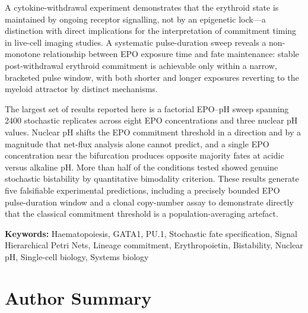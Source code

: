 \documentclass[10pt,letterpaper]{article}
\begin{document}
A cytokine-withdrawal experiment demonstrates that the erythroid state is
maintained by ongoing receptor signalling, not by an epigenetic lock---a
distinction with direct implications for the interpretation of commitment timing
in live-cell imaging studies. A systematic pulse-duration sweep reveals a
non-monotone relationship between EPO exposure time and fate maintenance: stable
post-withdrawal erythroid commitment is achievable only within a narrow,
bracketed pulse window, with both shorter and longer exposures reverting to the
myeloid attractor by distinct mechanisms.

The largest set of results reported here is a factorial EPO--pH sweep spanning
2400 stochastic replicates across eight EPO concentrations and three nuclear pH
values. Nuclear pH shifts the EPO commitment threshold in a direction and by a
magnitude that net-flux analysis alone cannot predict, and a single EPO
concentration near the bifurcation produces opposite majority fates at acidic
versus alkaline pH. More than half of the conditions tested showed genuine
stochastic bistability by quantitative bimodality criterion. These results
generate five falsifiable experimental predictions, including a precisely
bounded EPO pulse-duration window and a clonal copy-number assay to demonstrate
directly that the classical commitment threshold is a population-averaging
artefact.

\vspace{6pt}
\noindent\textbf{Keywords:} Haematopoiesis, GATA1, PU.1, Stochastic fate
specification, Signal Hierarchical Petri Nets, Lineage commitment,
Erythropoietin, Bistability, Nuclear pH, Single-cell biology, Systems biology

\section*{Author Summary}
\end{document}
